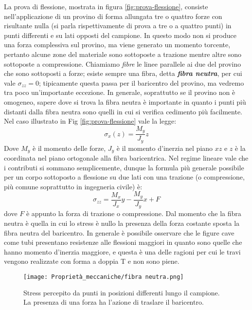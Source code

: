 La prova di flessione, mostrata in figura \ref{fig:prova-flessione}, consiste nell'applicazione di un provino di forma allungata tre o quattro forze con risultante nulla (si parla rispettivamente di prova a tre o a quattro punti) in punti differenti e su lati opposti del campione. In questo modo non si produce una forza complessiva sul provino, ma viene generato un momento torcente, pertanto alcune zone del materiale sono sottoposte a trazione mentre altre sono sottoposte a compressione. Chiamiamo \textit{fibre} le linee parallele ai due del provino che sono sottoposti a forze; esiste sempre una fibra, detta \textbf{\textit{fibra neutra}}, per cui vale $\sigma_{zz}=0$; tipicamente questa passa per il baricentro del provino, ma vedremo tra poco un'importante eccezione. In generale, soprattutto se il provino non è omogeneo, sapere dove si trova la fibra neutra è importante in quanto i punti più distanti dalla fibra neutra sono quelli in cui si verifica cedimento più facilmente.
Nel caso illustrato in Fig \ref{fig:prova-flessione} vale la legge:
\begin{equation}
    \sigma_x(z)=\frac{M_y}{J_y}z
\end{equation}
Dove $M_y$ è il momento delle forze, $J_y$ è il momento d'inerzia nel piano $xz$ e $z$ è la coordinata nel piano ortogonale alla fibra baricentrica.
Nel regime lineare vale che i contributi si sommano semplicemente, dunque la formula più generale possibile per un corpo sottoposto a flessione su due lati con una trazione (o compressione, più comune soprattutto in ingegneria civile) è:
\begin{equation}
    \sigma_{zz}=\frac{M_x}{J_x}y-\frac{M_y}{J_y}x+F
\end{equation}
dove $F$ è appunto la forza di trazione o compressione. Dal momento che la fibra neutra è quella in cui lo stress è nullo la presenza della forza costante sposta la fibra neutra del baricentro. In generale è possibile osservare che le figure cave come tubi presentano resistenze alle flessioni maggiori in quanto sono quelle che hanno momento d'inerzia maggiore, e questa è una delle ragioni per cui le travi vengono realizzate con forma a doppia T e non sono piene.

\begin{figure}[h]
    \centering
    \texttt{[image: Proprietà\_meccaniche/fibra neutra.png]}
    \caption{Stress percepito da punti in posizioni differenti lungo il campione. La presenza di una forza ha l'azione di traslare il baricentro.}
    \label{fibra-neutra}
\end{figure}

